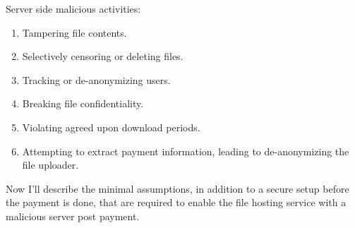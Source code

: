 \documentclass{ashoka-crypto}
\begin{document}
Server side malicious activities:
\begin{enumerate}
\item Tampering file contents.

\item Selectively censoring or deleting files.

\item Tracking or de-anonymizing users.

\item Breaking file confidentiality.

\item Violating agreed upon download periods.

\item Attempting to extract payment information, leading to de-anonymizing the file uploader.
\end{enumerate}

Now I'll describe the minimal assumptions, in addition to a secure setup before the payment is done, that are required to enable the file hosting service with a malicious server post payment.
\end{document}
